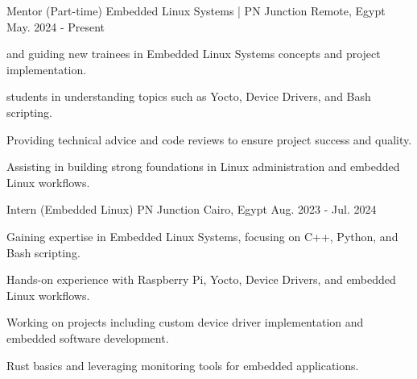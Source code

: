 \begin{cventries}
  \cventry
    {\normalsize  Mentor (Part-time)} %
    {\Large Embedded Linux Systems | PN Junction} %
    {\normalsize Remote, Egypt} %
    {\normalsize May. 2024 - Present} %
    {
      \begin{cvitems} %
        \item {\normalsizeMentoring and guiding new trainees in Embedded Linux Systems concepts and project implementation.}
        \item {\normalsizeSupporting students in understanding topics such as Yocto, Device Drivers, and Bash scripting.}
        \item {\normalsize Providing technical advice and code reviews to ensure project success and quality.}
        \item {\normalsize Assisting in building strong foundations in Linux administration and embedded Linux workflows.}
      \end{cvitems}
    }
  \cventry
    {\normalsize Intern (Embedded Linux)} %
    {\Large PN Junction} %
    {\normalsize Cairo, Egypt} %
    {\normalsize Aug. 2023 - Jul. 2024} %
    {
      \begin{cvitems} %
        \item {\normalsize Gaining expertise in Embedded Linux Systems, focusing on C++, Python, and Bash scripting.}
        \item {\normalsize Hands-on experience with Raspberry Pi, Yocto, Device Drivers, and embedded Linux workflows.}
        \item {\normalsize Working on projects including custom device driver implementation and embedded software development.}
        \item {\normalsizeLearning Rust basics and leveraging monitoring tools for embedded applications.}
      \end{cvitems}
}
\end{cventries}
